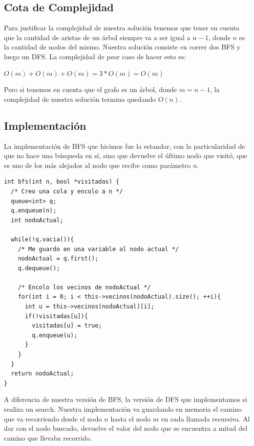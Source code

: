 \subsection{Cota de Complejidad}

Para justificar la complejidad de nuestra solución tenemos que tener en cuenta que la cantidad de aristas de un árbol siempre va a ser igual a $n-1$, donde $n$ es la cantidad de nodos del mismo. Nuestra solución consiste en correr dos BFS y luego un DFS. La complejidad de peor caso de hacer esto es:

\begin{center}
$O(m) + O(m) + O(m) = 3 * O(m) = O(m)$
\end{center}

Pero si tenemos en cuenta que el grafo es un árbol, donde $m = n - 1$, la complejidad de nuestra solución termina quedando $O(n)$.

\subsection{Implementación}

La implementación de BFS que hicimos fue la estandar, con la particularidad de que no hace una búsqueda en sí, sino que devuelve el último nodo que visitó, que es uno de los más alejados al nodo que recibe como parámetro $n$.

\begin{lstlisting}
int bfs(int n, bool *visitadas) {
  /* Creo una cola y encolo a n */
  queue<int> q;
  q.enqueue(n);
  int nodoActual;
  
  while(!q.vacia()){
    /* Me guardo en una variable al nodo actual */
    nodoActual = q.first();
    q.dequeue();
    
    /* Encolo los vecinos de nodoActual */
    for(int i = 0; i < this->vecinos(nodoActual).size(); ++i){
      int u = this->vecinos(nodoActual)[i];
      if(!visitadas[u]){
        visitadas[u] = true;
        q.enqueue(u);
      }
    }
  }
  return nodoActual;
}
\end{lstlisting}

A diferencia de nuestra versión de BFS, la versión de DFS que implementamos si realiza un search. Nuestra implementación va guardando en memoria el camino que va recorriendo desde el nodo $n$ hasta el nodo $m$ en cada llamada recursiva. Al dar con el nodo buscado, devuelve el valor del nodo que se encuentra a mitad del camino que llevaba recorrido.

